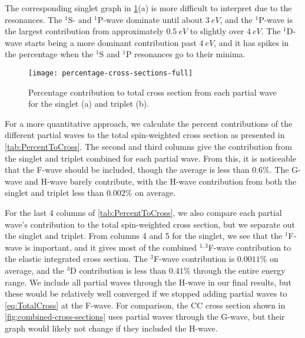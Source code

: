 \documentclass[Dissertation.tex]{subfiles}
\begin{document}
The corresponding singlet graph in \cref{fig:percentage-cross-sections-full}(a)
is more difficult to interpret due to the resonances. The $^1$S- and
$^1$P-wave dominate until about $\SI{3}{eV}$, and the $^1$P-wave is the largest 
contribution from approximately $\SI{0.5}{eV}$ to slightly over $\SI{4}{eV}$.
The $^1$D-wave starts being a more dominant contribution past $\SI{4}{eV}$, and
it has spikes in the percentage when the $^1$S and $^1$P resonances go to their
minima.

\begin{figure}[H]
	\centering
	\texttt{[image: percentage-cross-sections-full]}
	\caption[Percentage contribution to total cross section]{Percentage contribution to total cross section from each partial wave for the singlet (a) and triplet (b).}
	\label{fig:percentage-cross-sections-full}
\end{figure}

For a more quantitative approach, we calculate the percent contributions of the
different partial waves to the total spin-weighted cross section as presented
in \cref{tab:PercentToCross}. The second and third columns give the
contribution from the singlet and triplet combined for each partial wave. From
this, it is noticeable that the F-wave should be included, though the average
is less than $0.6\%$. The G-wave and H-wave barely contribute, with the H-wave
contribution from both the singlet and triplet less than $0.002\%$ on 
average.

For the last 4 columns of \cref{tab:PercentToCross}, we also compare each
partial wave's contribution to the total spin-weighted cross section, but we
separate out the singlet and triplet. From columns 4 and 5 for the singlet,
we see that the $^1$F-wave is important, and it gives most of the combined
$^{1,3}$F-wave contribution to the elastic integrated cross section. The 
$^3$F-wave contribution is $0.0011\%$ on average, and the $^3$D contribution 
is less than $0.41\%$ through the entire energy range. We include all partial
waves through the H-wave in our final results, but these would be relatively
well converged if we stopped adding partial waves to \cref{eq:TotalCross} at
the F-wave. For comparison, the CC \cite{Walters2004} cross section shown in
\cref{fig:combined-cross-sections} uses partial waves through the G-wave, but
their graph would likely not change if they included the H-wave.
\end{document}
